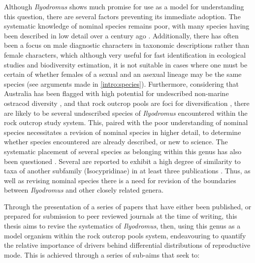 Although \textit{Ilyodromus} shows much promise for use as a model for understanding this question, there are several factors preventing its immediate adoption. The systematic knowledge of nominal species remains poor, with many species having been described in low detail over a century ago \parencite{sars_contributions_1894,sars_freshwater_1896,king_australian_1855}. Additionally, there has often been a focus on male diagnostic characters in taxonomic descriptions rather than female characters, which although very useful for fast identification in ecological studies and biodiversity estimation, it is not suitable in cases where one must be certain of whether females of a sexual and an asexual lineage may be the same species (see arguments made in \cref{intro:species}). Furthermore, considering that Australia has been flagged with high potential for undescribed non-marine ostracod diversity \parencite{martens_global_2008}, and that rock outcrop pools are foci for diversification \parencite{pinder_granite_2000}, there are likely to be several undescribed species of \textit{Ilyodromus} encountered within the rock outcrop study system. This, paired with the poor understanding of nominal species necessitates a revision of nominal species in higher detail, to determine whether species encountered are already described, or new to science. The systematic placement of several species as belonging within this genus has also been questioned \parencite{martens_taxonomy_2001}. Several are reported to exhibit a high degree of similarity to taxa of another subfamily (Isocypridinae) in at least three publications \parencite{martens_taxonomy_2001,de_deckker_ostracoda_1981,mckenzie_freshwater_1966}. Thus, as well as revising nominal species there is a need for revision of the boundaries between \textit{Ilyodromus} and other closely related genera. 

Through the presentation of a series of papers that have either been published, or prepared for submission to peer reviewed journals at the time of writing, this thesis aims to revise the systematics of \textit{Ilyodromus}, then, using this genus as a model organism within the rock outcrop pools system, endeavouring to quantify the relative importance of drivers behind differential distributions of reproductive mode. This is achieved through a series of sub-aims that seek to:

